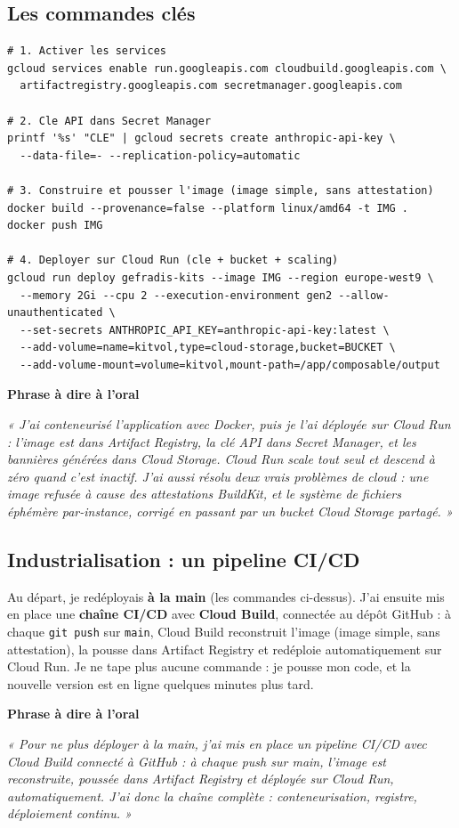 \documentclass[11pt,a4paper]{article}
\newcommand{\phrasea}[1]{%
  \begin{phrasebox}
  {\bfseries\color{gefblue}\textsf{Phrase à dire à l'oral}}\par\smallskip
  \itshape #1
  \end{phrasebox}%
}
\begin{document}
\subsection{Les commandes clés}
\begin{verbatim}
# 1. Activer les services
gcloud services enable run.googleapis.com cloudbuild.googleapis.com \
  artifactregistry.googleapis.com secretmanager.googleapis.com

# 2. Cle API dans Secret Manager
printf '%s' "CLE" | gcloud secrets create anthropic-api-key \
  --data-file=- --replication-policy=automatic

# 3. Construire et pousser l'image (image simple, sans attestation)
docker build --provenance=false --platform linux/amd64 -t IMG .
docker push IMG

# 4. Deployer sur Cloud Run (cle + bucket + scaling)
gcloud run deploy gefradis-kits --image IMG --region europe-west9 \
  --memory 2Gi --cpu 2 --execution-environment gen2 --allow-unauthenticated \
  --set-secrets ANTHROPIC_API_KEY=anthropic-api-key:latest \
  --add-volume=name=kitvol,type=cloud-storage,bucket=BUCKET \
  --add-volume-mount=volume=kitvol,mount-path=/app/composable/output
\end{verbatim}

\phrasea{« J'ai conteneurisé l'application avec Docker, puis je l'ai déployée sur Cloud
Run : l'image est dans Artifact Registry, la clé API dans Secret Manager, et les
bannières générées dans Cloud Storage. Cloud Run scale tout seul et descend à zéro quand
c'est inactif. J'ai aussi résolu deux vrais problèmes de cloud : une image refusée à
cause des attestations BuildKit, et le système de fichiers éphémère par-instance, corrigé
en passant par un bucket Cloud Storage partagé. »}

\subsection{Industrialisation : un pipeline CI/CD}
Au départ, je redéployais \textbf{à la main} (les commandes ci-dessus). J'ai ensuite mis
en place une \textbf{chaîne CI/CD} avec \textbf{Cloud Build}, connectée au dépôt GitHub :
à chaque \texttt{git push} sur \texttt{main}, Cloud Build reconstruit l'image (image
simple, sans attestation), la pousse dans Artifact Registry et redéploie automatiquement
sur Cloud Run. Je ne tape plus aucune commande : je pousse mon code, et la nouvelle
version est en ligne quelques minutes plus tard.

\phrasea{« Pour ne plus déployer à la main, j'ai mis en place un pipeline CI/CD avec Cloud
Build connecté à GitHub : à chaque push sur main, l'image est reconstruite, poussée dans
Artifact Registry et déployée sur Cloud Run, automatiquement. J'ai donc la chaîne
complète : conteneurisation, registre, déploiement continu. »}
\end{document}
